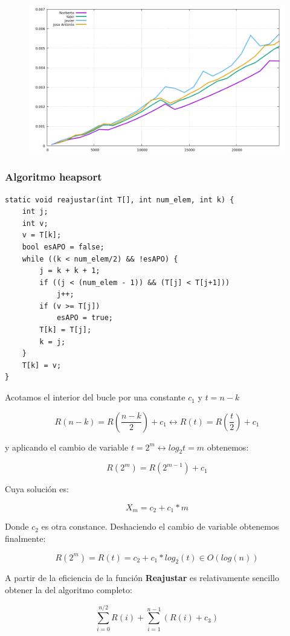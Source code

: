 \documentclass[spanish]{beamer}
\begin{document}
\begin{frame}
    \begin{figure}[H]
    \centering   
        \includegraphics[clip,width=1\columnwidth]{../plots/mergesort}%
    \end{figure}
\end{frame}

\begin{frame}[fragile]\frametitle{Algoritmo heapsort}

  \begin{lstlisting}
static void reajustar(int T[], int num_elem, int k) {
	int j;
	int v;
	v = T[k];
	bool esAPO = false;
	while ((k < num_elem/2) && !esAPO) {
		j = k + k + 1;
		if ((j < (num_elem - 1)) && (T[j] < T[j+1]))
			j++;
		if (v >= T[j])
			esAPO = true;
		T[k] = T[j];
		k = j;
	}
	T[k] = v;
}
\end{lstlisting}
  
\end{frame}

\begin{frame}
  Acotamos el interior del bucle por una constante $c_1$ y $ t = n-k$

  $$R(n-k) = R(\frac{n-k}{2}) + c_1 \leftrightarrow R(t) = R(\frac{t}{2}) + c_1$$

  y aplicando el cambio de variable $t = 2^m \leftrightarrow log_2 t = m$ obtenemos:

  $$R(2^m) = R(2^{m-1}) + c_1$$

  Cuya solución es:

  $$X_m = c_2 + c_1 * m$$

\end{frame}

\begin{frame}
  Donde $c_2$ es otra constance. Deshaciendo el cambio de variable obtenemos finalmente:

$$R(2^m) = R(t) = c_2 + c_1 * log_2(t) \in O(log(n))$$

A partir de la eficiencia de la función \textbf{Reajustar} es relativamente sencillo obtener la del algoritmo completo:

$$\sum_{i=0}^{n/2} R(i) + \sum_{i=1}^{n-1} (R(i) + c_3) $$

\end{frame}
\end{document}
